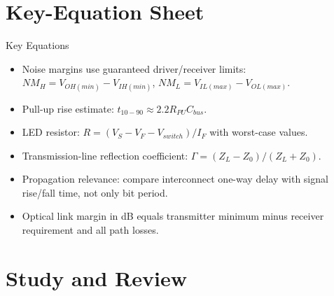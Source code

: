 \documentclass[10pt,letterpaper]{article}
\begin{document}
\section{Key-Equation Sheet}
\begin{CornellExamBox}{Key Equations}
\begin{itemize}
  \item Noise margins use guaranteed driver/receiver limits: $NM_H=V_{OH(min)}-V_{IH(min)}$, $NM_L=V_{IL(max)}-V_{OL(max)}$.
  \item Pull-up rise estimate: $t_{10-90}\approx2.2R_{PU}C_{bus}$.
  \item LED resistor: $R=(V_S-V_F-V_{switch})/I_F$ with worst-case values.
  \item Transmission-line reflection coefficient: $\Gamma=(Z_L-Z_0)/(Z_L+Z_0)$.
  \item Propagation relevance: compare interconnect one-way delay with signal rise/fall time, not only bit period.
  \item Optical link margin in dB equals transmitter minimum minus receiver requirement and all path losses.
\end{itemize}\end{CornellExamBox}
\section{Study and Review}
\end{document}
